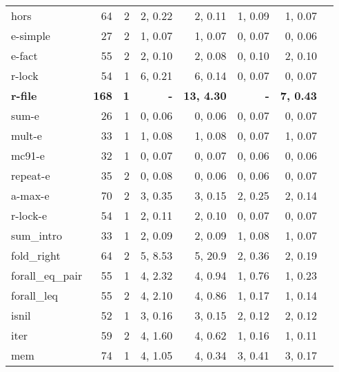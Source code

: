 \begin{table}
\begin{center}
\begin{tabular}{|l|r|r|r|r|r|r|r|}
 hors       &    64&      2& 2,  0.22 & 2,  0.11 & 1,  0.09 & 1,  0.07 \\
 e-simple   &    27&      2& 1,  0.07 & 1,  0.07 & 0,  0.07 & 0,  0.06 \\
 e-fact     &    55&      2& 2,  0.10 & 2,  0.08 & 0,  0.10 & 2,  0.10 \\
 r-lock     &    54&      1& 6,  0.21 & 6,  0.14 & 0,  0.07 & 0,  0.07 \\
\bf r-file     &\bf   168&\bf      1&\bf        - &\bf 13, 4.30 &\bf        - &\bf 7,  0.43 \\
 sum-e      &    26&      1& 0,  0.06 & 0,  0.06 & 0,  0.07 & 0,  0.07 \\
 mult-e     &    33&      1& 1,  0.08 & 1,  0.08 & 0,  0.07 & 1,  0.07 \\
 mc91-e     &    32&      1& 0,  0.07 & 0,  0.07 & 0,  0.06 & 0,  0.06 \\
 repeat-e   &    35&      2& 0,  0.08 & 0,  0.06 & 0,  0.06 & 0,  0.07 \\
 a-max-e    &    70&      2& 3,  0.35 & 3,  0.15 & 2,  0.25 & 2,  0.14 \\
 r-lock-e   &    54&      1& 2,  0.11 & 2,  0.10 & 0,  0.07 & 0,  0.07 \\
\hline
 sum\_intro        &  33 & 1 & 2, 0.09 & 2, 0.09 & 1, 0.08 & 1, 0.07 \\
 fold\_right       &  64 & 2 & 5, 8.53 & 5, 20.9 & 2, 0.36 & 2, 0.19 \\
 forall\_eq\_pair  &  55 & 1 & 4, 2.32 & 4, 0.94 & 1, 0.76 & 1, 0.23 \\
 forall\_leq       &  55 & 2 & 4, 2.10 & 4, 0.86 & 1, 0.17 & 1, 0.14 \\
 isnil             &  52 & 1 & 3, 0.16 & 3, 0.15 & 2, 0.12 & 2, 0.12 \\
 iter              &  59 & 2 & 4, 1.60 & 4, 0.62 & 1, 0.16 & 1, 0.11 \\
 mem               &  74 & 1 & 4, 1.05 & 4, 0.34 & 3, 0.41 & 3, 0.17 \\

\end{tabular}
\end{center}
\end{table}
